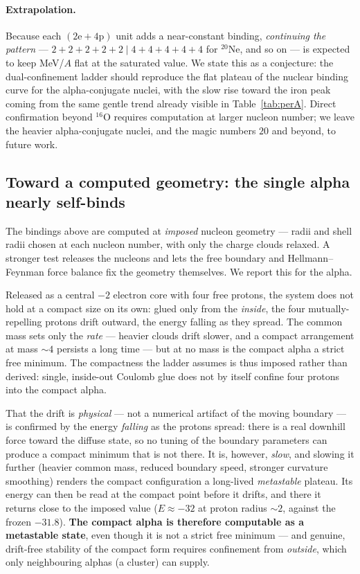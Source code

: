 \documentclass[11pt]{article}
\begin{document}
\paragraph{Extrapolation.} Because each $(\mathrm{2e}+\mathrm{4p})$ unit adds a near-constant
binding, \emph{continuing the pattern} --- $2{+}2{+}2{+}2{+}2\mid 4{+}4{+}4{+}4{+}4$ for
$^{20}$Ne, and so on --- is expected to keep MeV/$A$ flat at the saturated value. We state this
as a conjecture: the dual-confinement ladder should reproduce the flat plateau of the nuclear
binding curve for the alpha-conjugate nuclei, with the slow rise toward the iron peak coming
from the same gentle trend already visible in Table~\ref{tab:perA}. Direct confirmation beyond
$^{16}$O requires computation at larger nucleon number; we leave the heavier alpha-conjugate
nuclei, and the magic numbers $20$ and beyond, to future work.

\subsection{Toward a computed geometry: the single alpha nearly self-binds}
\label{sec:computed-geom}

The bindings above are computed at \emph{imposed} nucleon geometry --- radii and shell radii
chosen at each nucleon number, with only the charge clouds relaxed. A stronger test releases the
nucleons and lets the free boundary and Hellmann--Feynman force balance fix the geometry
themselves. We report this for the alpha.

Released as a central $-2$ electron core with four free protons, the system does not hold at a
compact size on its own: glued only from the \emph{inside}, the four mutually-repelling protons
drift outward, the energy falling as they spread. The common mass sets only the \emph{rate} ---
heavier clouds drift slower, and a compact arrangement at mass ${\sim}4$ persists a long time ---
but at no mass is the compact alpha a strict free minimum. The compactness the ladder assumes is
thus imposed rather than derived: single, inside-out Coulomb glue does not by itself confine four
protons into the compact alpha.

That the drift is \emph{physical} --- not a numerical artifact of the moving boundary --- is
confirmed by the energy \emph{falling} as the protons spread: there is a real downhill force
toward the diffuse state, so no tuning of the boundary parameters can produce a compact minimum
that is not there. It is, however, \emph{slow}, and slowing it further (heavier common mass,
reduced boundary speed, stronger curvature smoothing) renders the compact configuration a
long-lived \emph{metastable} plateau. Its energy can then be read at the compact point before it
drifts, and there it returns close to the imposed value ($E\approx -32$ at proton radius ${\sim}2$,
against the frozen $-31.8$). \textbf{The compact alpha is therefore computable as a metastable
state}, even though it is not a strict free minimum --- and genuine, drift-free stability of the
compact form requires confinement from \emph{outside}, which only neighbouring alphas (a cluster)
can supply.
\end{document}
